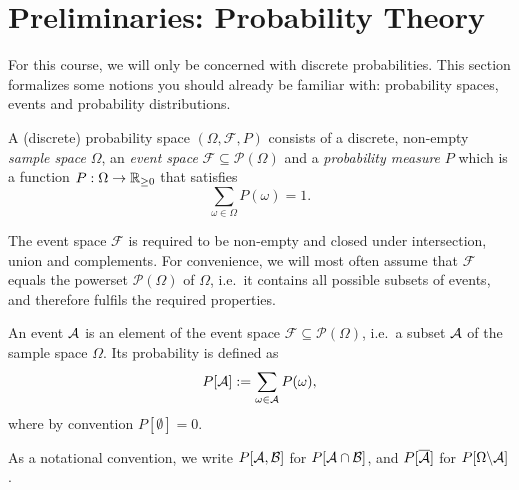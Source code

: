 \section{Preliminaries: Probability Theory}
For this course, we will only be concerned with discrete probabilities. This section formalizes some notions you should already be familiar with: probability spaces, events and probability distributions.

\begin{definition}
A (discrete) probability space $(\Omega, \mathcal{F}, P)$ consists of a
discrete, non-empty \emph{sample space} $\Omega$, an \emph{event space}
$\mathcal{F} \subseteq \mathcal{P}(\Omega)$ and a \emph{probability measure} $P$ which is a function $P : \Omega \to \mathbb{R}_{\geq 0}$ that satisfies
\[
\sum_{\omega \in \Omega} P(\omega) = 1.
\]
\end{definition}
The event space $\mathcal{F}$ is required to be non-empty and closed under
intersection, union and complements. For convenience, we will most
often assume that $\mathcal{F}$ equals the powerset
$\mathcal{P}(\Omega)$ of $\Omega$, i.e.\ it
contains all
possible subsets of events, and therefore fulfils the required properties.

\begin{definition}[Event]\label{def:event}
An event $\mathcal{A}$ is an element of the event space $\mathcal{F}
\subseteq \mathcal{P}(\Omega)$, i.e.\ a subset $\mathcal{A}$ of the sample space $\Omega$. Its probability is defined as
\[
P[\mathcal{A}] := \sum_{\omega \in \mathcal{A}} P(\omega),
\]
where by convention $P[\emptyset] = 0$.
\end{definition}
As a notational convention, we write $P[\mathcal{A},\mathcal{B}]$ for $P[\mathcal{A} \cap \mathcal{B}]$, and $P[\overline{\mathcal{A}}]$ for $P[\Omega\backslash\mathcal{A}]$.

